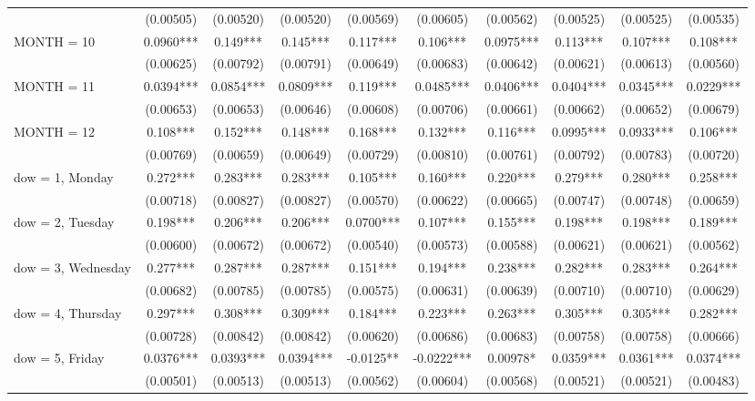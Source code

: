 \begin{tabular}{lccccccccc}
 & (0.00505) & (0.00520) & (0.00520) & (0.00569) & (0.00605) & (0.00562) & (0.00525) & (0.00525) & (0.00535) \\
MONTH = 10 & 0.0960*** & 0.149*** & 0.145*** & 0.117*** & 0.106*** & 0.0975*** & 0.113*** & 0.107*** & 0.108*** \\
 & (0.00625) & (0.00792) & (0.00791) & (0.00649) & (0.00683) & (0.00642) & (0.00621) & (0.00613) & (0.00560) \\
MONTH = 11 & 0.0394*** & 0.0854*** & 0.0809*** & 0.119*** & 0.0485*** & 0.0406*** & 0.0404*** & 0.0345*** & 0.0229*** \\
 & (0.00653) & (0.00653) & (0.00646) & (0.00608) & (0.00706) & (0.00661) & (0.00662) & (0.00652) & (0.00679) \\
MONTH = 12 & 0.108*** & 0.152*** & 0.148*** & 0.168*** & 0.132*** & 0.116*** & 0.0995*** & 0.0933*** & 0.106*** \\
 & (0.00769) & (0.00659) & (0.00649) & (0.00729) & (0.00810) & (0.00761) & (0.00792) & (0.00783) & (0.00720) \\
dow = 1, Monday & 0.272*** & 0.283*** & 0.283*** & 0.105*** & 0.160*** & 0.220*** & 0.279*** & 0.280*** & 0.258*** \\
 & (0.00718) & (0.00827) & (0.00827) & (0.00570) & (0.00622) & (0.00665) & (0.00747) & (0.00748) & (0.00659) \\
dow = 2, Tuesday & 0.198*** & 0.206*** & 0.206*** & 0.0700*** & 0.107*** & 0.155*** & 0.198*** & 0.198*** & 0.189*** \\
 & (0.00600) & (0.00672) & (0.00672) & (0.00540) & (0.00573) & (0.00588) & (0.00621) & (0.00621) & (0.00562) \\
dow = 3, Wednesday & 0.277*** & 0.287*** & 0.287*** & 0.151*** & 0.194*** & 0.238*** & 0.282*** & 0.283*** & 0.264*** \\
 & (0.00682) & (0.00785) & (0.00785) & (0.00575) & (0.00631) & (0.00639) & (0.00710) & (0.00710) & (0.00629) \\
dow = 4, Thursday & 0.297*** & 0.308*** & 0.309*** & 0.184*** & 0.223*** & 0.263*** & 0.305*** & 0.305*** & 0.282*** \\
 & (0.00728) & (0.00842) & (0.00842) & (0.00620) & (0.00686) & (0.00683) & (0.00758) & (0.00758) & (0.00666) \\
dow = 5, Friday & 0.0376*** & 0.0393*** & 0.0394*** & -0.0125** & -0.0222*** & 0.00978* & 0.0359*** & 0.0361*** & 0.0374*** \\
 & (0.00501) & (0.00513) & (0.00513) & (0.00562) & (0.00604) & (0.00568) & (0.00521) & (0.00521) & (0.00483) \\

\end{tabular}
